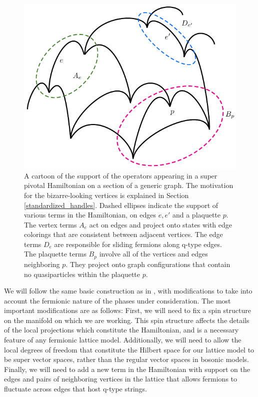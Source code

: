 \documentclass[12pt,a4paper]{article}
\begin{document}
 \begin{figure}
\begin{center}
  \includegraphics{sample_lattice.pdf}
 \caption{A cartoon of the support of the operators appearing in a super pivotal Hamiltonian on a section of a generic graph. 
The motivation for the bizarre-looking vertices is explained in Section \ref{standardized_handles}.
Dashed ellipses indicate the support of various terms in the Hamiltonian, on edges $e,e'$ and a plaquette $p$.
The vertex terms $A_e$ act on edges and project onto states with edge colorings that are consistent between adjacent vertices. 
The edge terms $D_e$ are responsible for sliding fermions along q-type edges. 
The plaquette terms $B_p$ involve all of the vertices and edges neighboring $p$.
They project onto graph configurations that contain no quasiparticles within the plaquette $p$.}
 \label{example_lattice}
 \end{center}
 \end{figure}

We will follow the same basic construction as in \cite{levin2005}, with modifications to take into account 
the fermionic nature of the phases under consideration. 
The most important modifications are as follows:
First, we will need to fix a spin structure on the manifold on which we are working.
This spin structure affects the details of the local projections which constitute the Hamiltonian, and is a necessary feature of any fermionic lattice model.
Additionally, we will need to allow the local degrees of freedom that constitute the 
Hilbert space for our lattice model to be super vector spaces, rather than the regular vector spaces in bosonic models. 
Finally, we will need to add a new term in the Hamiltonian with support on the edges and pairs of neighboring vertices in the lattice that allows fermions to fluctuate across edges 
that host q-type strings.
\end{document}
